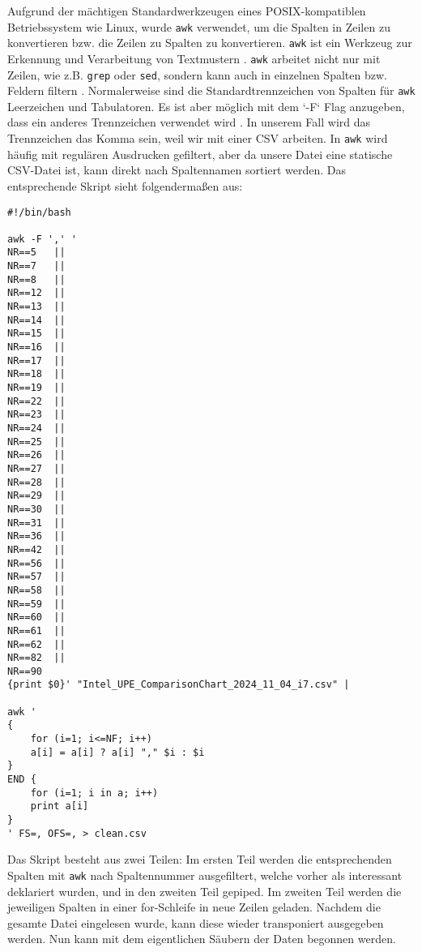 Aufgrund der mächtigen Standardwerkzeugen eines POSIX-kompatiblen Betriebssystem wie Linux, wurde \lstinline |awk| verwendet, um die Spalten in Zeilen zu konvertieren bzw. die Zeilen zu Spalten zu konvertieren.
\lstinline |awk| ist ein Werkzeug zur Erkennung und Verarbeitung von Textmustern \cite{noauthor_awk1_nodate}.
\lstinline |awk| arbeitet nicht nur mit Zeilen, wie z.B. \lstinline |grep| oder \lstinline |sed|, sondern kann auch in einzelnen Spalten bzw. Feldern filtern \cite{noauthor_awk1_nodate}.
Normalerweise sind die Standardtrennzeichen von Spalten für \lstinline |awk|  Leerzeichen und Tabulatoren. Es ist aber möglich mit dem `-F` Flag anzugeben, dass ein anderes Trennzeichen verwendet wird \cite{noauthor_awk1_nodate}.
In unserem Fall wird das Trennzeichen das Komma sein, weil wir mit einer CSV arbeiten.
In \lstinline |awk| wird häufig mit regulären Ausdrucken gefiltert, aber da unsere Datei eine statische CSV-Datei ist, kann direkt nach Spaltennamen sortiert werden.
Das entsprechende Skript sieht folgendermaßen aus:

\begin{lstlisting}[caption={\texttt{clean.sh}},captionpos=b]
#!/bin/bash

awk -F ',' '
NR==5   ||
NR==7   ||
NR==8   ||
NR==12  ||
NR==13  ||
NR==14  ||
NR==15  ||
NR==16  ||
NR==17  ||
NR==18  ||
NR==19  ||
NR==22  ||
NR==23  ||
NR==24  ||
NR==25  ||
NR==26  ||
NR==27  ||
NR==28  ||
NR==29  ||
NR==30  ||
NR==31  ||
NR==36  ||
NR==42  ||
NR==56  ||
NR==57  ||
NR==58  ||
NR==59  ||
NR==60  ||
NR==61  ||
NR==62  ||
NR==82  ||
NR==90 
{print $0}' "Intel_UPE_ComparisonChart_2024_11_04_i7.csv" |

awk '
{
	for (i=1; i<=NF; i++)  
	a[i] = a[i] ? a[i] "," $i : $i  
}
END {
	for (i=1; i in a; i++)  
	print a[i]
}
' FS=, OFS=, > clean.csv
\end{lstlisting}

Das Skript besteht aus zwei Teilen: Im ersten Teil werden die entsprechenden Spalten mit \lstinline |awk| nach Spaltennummer ausgefiltert, welche vorher als interessant deklariert wurden, und in den zweiten Teil gepiped. 
Im zweiten Teil werden die jeweiligen Spalten in einer for-Schleife in neue Zeilen geladen. Nachdem die gesamte Datei eingelesen wurde, kann diese wieder transponiert ausgegeben werden. Nun kann mit dem eigentlichen Säubern der Daten begonnen werden.



